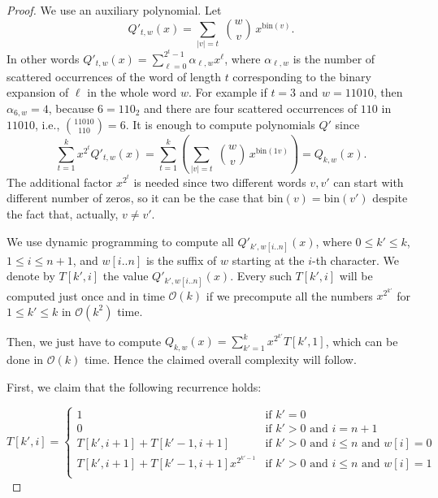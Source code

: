 \documentclass[runningheads]{llncs}
\newcommand{\bigo}{{\mathcal{O}}}
\begin{document}
\begin{proof}
We use an auxiliary polynomial. Let $$Q'_{t,w}(x)=\sum_{|v|=t}\; {w\choose v}\, x^{\mathrm{bin}(v)}.$$
In other words  $Q'_{t,w}(x)=\sum_{\ell=0}^{2^{t}-1} \alpha_{\ell,w}x^{\ell}$, where $\alpha_{\ell,w}$ is the number of
scattered occurrences of the word of length $t$ corresponding to the binary expansion of $\ell$ in the whole word $w$.
For example if $t=3$ and $w=11010$,
then $\alpha_{6,w}=4$, because $6=110_{2}$ and there are four scattered occurrences of $110$ in $11010$, i.e., ${{11010}\choose {110}}=6$.
It is enough to compute polynomials $Q'$ since
$$\sum_{t=1}^{k} x^{2^{t}} Q'_{t,w}(x) = \sum_{t=1}^k \left( \sum_{|v|=t}\; {w\choose v}\, x^{\mathrm{bin}(1v)}\right )=Q_{k,w}(x).$$
The additional factor $x^{2^{t}}$ is needed
since two different words $v,v'$ can start with different number of zeros,
so it can be the case that $\mathrm{bin}(v)=\mathrm{bin}(v')$ despite the fact that, actually, $v\neq v'$.

We use dynamic programming to compute all $Q'_{k',w[i..n]}(x)$, where $0\leq k'\leq k$, $1\leq i\leq n+1$, and $w[i..n]$ is the suffix of $w$ starting at
the $i$-th character. We denote by $T[k',i]$ the value $Q'_{k',w[i..n]}(x)$. Every such $T[k',i]$ will be computed just once and in time $\bigo(k)$ if we precompute all the numbers $x^{2^{k'}}$ for $1\leq k'\leq k$ in $\bigo(k^{2})$ time.

Then, we just have to compute $Q_{k,w}(x)=\sum_{k'=1}^{k}x^{2^{k'}}T[k',1]$, which can be done in $\bigo(k)$ time. Hence the claimed overall complexity will follow. 

First, we claim that the following recurrence holds:

$$
T[k',i]=\begin{cases}
1 & \text{if } k'=0\\
0 & \text{if } k'>0 \text{ and } i=n+1\\
T[k',i+1]+T[k'-1,i+1] & \text{if } k'>0 \text{ and } i\leq n \text{ and } w[i]=0\\
T[k',i+1]+T[k'-1,i+1]x^{2^{k'-1}} & \text{if } k'>0 \text{ and } i\leq n \text{ and } w[i]=1\\
\end{cases}
$$


\end{proof}
\end{document}

